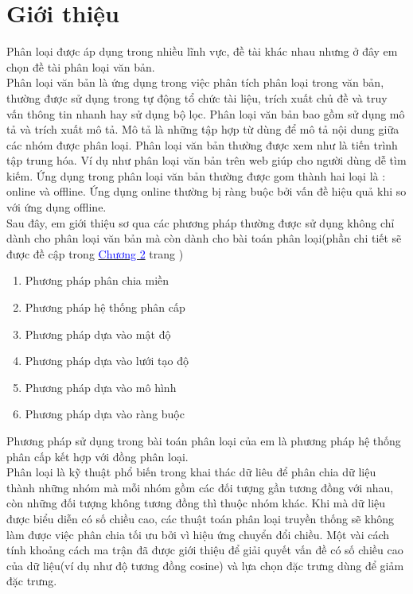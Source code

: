 \chapter{Giới thiệu}
\label{Chapter1}

\hspace{10mm}Phân loại được áp dụng trong nhiều lĩnh vực, đề tài khác nhau nhưng ở đây em chọn đề tài phân loại văn bản.\\
\hspace*{10mm}Phân loại văn bản là ứng dụng trong việc phân tích phân loại trong văn bản, thường được sử dụng trong tự động tổ chức tài liệu, trích xuất chủ đề và truy vấn thông tin nhanh hay sử dụng bộ lọc. Phân loại văn bản bao gồm sử dụng mô tả và trích xuất mô tả. Mô tả là những tập hợp từ dùng để mô tả nội dung giữa các nhóm được phân loại. Phân loại văn bản thường được xem như là tiến trình tập trung hóa. Ví dụ như phân loại văn bản trên web giúp cho người dùng dễ tìm kiếm. Ứng dụng trong phân loại văn bản thường được gom thành hai loại là : online và offline. Ứng dụng online thường bị ràng buộc bởi vấn đề hiệu quả khi so với ứng dụng offline.\\
\hspace*{10mm}Sau đây, em giới thiệu sơ qua các phương pháp thường được sử dụng không chỉ dành cho phân loại văn bản mà còn dành cho bài toán phân loại(phần chi tiết sẽ được đề cập trong \hyperref[Chapter2]{\textcolor{blue}{Chương 2}} trang \textcolor{blue}{\pageref{Chapter2}})
\begin{enumerate}
\item[] Phương pháp phân chia miền
\item[] Phương pháp hệ thống phân cấp
\item[] Phương pháp dựa vào mật độ
\item[] Phương pháp dựa vào lưới tạo độ
\item[] Phương pháp dựa vào mô hình
\item[] Phương pháp dựa vào ràng buộc
\end{enumerate}
\hspace{10mm}Phương pháp sử dụng trong bài toán phân loại của em là phương pháp hệ thống phân cấp kết hợp với đồng phân loại.\\
\hspace*{10mm}Phân loại là kỹ thuật phổ biến trong khai thác dữ liêu để phân chia dữ liệu thành những nhóm mà mỗi nhóm gồm các đối tượng gần tương đồng với nhau, còn những đối tượng không tương đồng thì thuộc nhóm khác. Khi mà dữ liệu được biểu diễn có số chiều cao, các thuật toán phân loại truyền thống sẽ không làm được việc phân chia tối ưu bởi vì hiệu ứng chuyển đổi chiều. Một vài cách tính khoảng cách ma trận đã được giới thiệu để giải quyết vấn đề có số chiều cao của dữ liệu(ví dụ như độ tương đồng cosine) và lựa chọn đặc trưng dùng để giảm đặc trưng. \\
